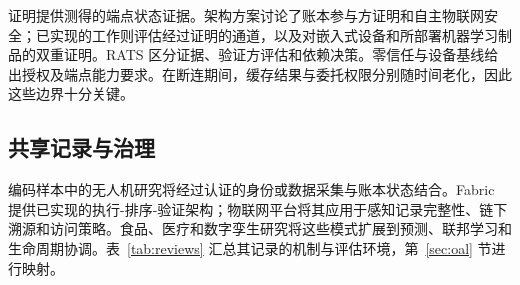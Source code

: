 证明提供测得的端点状态证据。架构方案讨论了账本参与方证明和自主物联网安全\citep{hardjono2021towards,figueiredo2022arcadian}；已实现的工作则评估经过证明的通道，以及对嵌入式设备和所部署机器学习制品的双重证明\citep{ott2023universal,baciu2025secure}。RATS 区分证据、验证方评估和依赖决策\citep{birkholz2023remote}。零信任与设备基线给出授权及端点能力要求\citep{rose2020zero,syed2022zero,fagan2020iot}。在断连期间，缓存结果与委托权限分别随时间老化，因此这些边界十分关键。

\subsection{共享记录与治理}

编码样本中的无人机研究将经过认证的身份或数据采集与账本状态结合\citep{han2022identity,tan2022blockchain,karmakar2024blockchain,islam2019bus}。Fabric 提供已实现的执行-排序-验证架构\citep{androulaki2018hyperledger}；物联网平台将其应用于感知记录完整性、链下溯源和访问策略\citep{hang2019design,honarpajooh2021iot,liu2020fabric}。食品、医疗和数字孪生研究将这些模式扩展到预测、联邦学习和生命周期协调\citep{khan2020iot,rahman2020secure,suhail2022trustworthy}。表~\ref{tab:reviews} 汇总其记录的机制与评估环境，第~\ref{sec:oal} 节进行映射。

